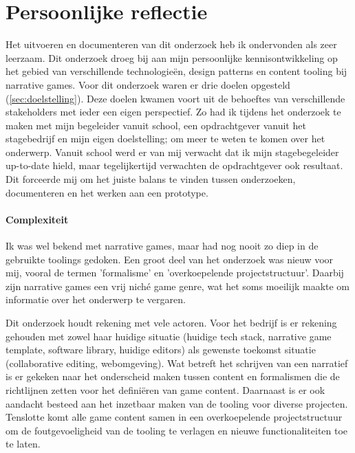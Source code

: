 \chapter{Persoonlijke reflectie}
\label{ch:reflection}
Het uitvoeren en documenteren van dit onderzoek heb ik ondervonden als zeer leerzaam. Dit onderzoek droeg bij aan mijn persoonlijke kennisontwikkeling op het gebied van verschillende technologieën, design patterns en content tooling bij narrative games. Voor dit onderzoek waren er drie doelen opgesteld (\autoref{sec:doelstelling}). Deze doelen kwamen voort uit de behoeftes van verschillende stakeholders met ieder een eigen perspectief. Zo had ik tijdens het onderzoek te maken met mijn begeleider vanuit school, een opdrachtgever vanuit het stagebedrijf en mijn eigen doelstelling; om meer te weten te komen over het onderwerp. Vanuit school werd er van mij verwacht dat ik mijn stagebegeleider up-to-date hield, maar tegelijkertijd verwachten de opdrachtgever ook resultaat. Dit forceerde mij om het juiste balans te vinden tussen onderzoeken, documenteren en het werken aan een prototype.

\subsubsection{Complexiteit}
Ik was wel bekend met narrative games, maar had nog nooit zo diep in de gebruikte toolings gedoken. Een groot deel van het onderzoek was nieuw voor mij, vooral de termen 'formalisme' en 'overkoepelende projectstructuur'. Daarbij zijn narrative games een vrij niché game genre, wat het soms moeilijk maakte om informatie over het onderwerp te vergaren. 

Dit onderzoek houdt rekening met vele actoren. Voor het bedrijf is er rekening gehouden met zowel haar huidige situatie (huidige tech stack, narrative game template, software library, huidige editors) als gewenste toekomst situatie (collaborative editing, webomgeving). Wat betreft het schrijven van een narratief is er gekeken naar het onderscheid maken tussen content en formalismen die de richtlijnen zetten voor het definiëren van game content. Daarnaast is er ook aandacht besteed aan het inzetbaar maken van de tooling voor diverse projecten. Tenslotte komt alle game content samen in een overkoepelende projectstructuur om de foutgevoeligheid van de tooling te verlagen en nieuwe functionaliteiten toe te laten.

